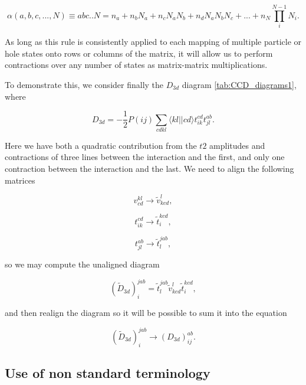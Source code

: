 \begin{equation}
\alpha(a,b,c,...,N) \equiv abc..N = n_a + n_bN_a + n_cN_aN_b + n_dN_aN_bN_c + ... + n_N \prod_i^{N-1} N_i  .
\end{equation}

As long as this rule is consistently applied to each mapping of multiple particle or hole states onto rows or columns of the matrix, it will allow us to perform contractions over any number of states as matrix-matrix multiplications. 

To demonstrate this, we consider finally the $D_{3d}$ diagram \ref{tab:CCD_diagrams1}, where 

\begin{equation}
D_{3d}= -\frac{1}{2} P(ij) \sum_{cdkl} \langle kl \vert \vert cd \rangle t_{ik}^{cd} t_{jl}^{ab}.
\end{equation}

Here we have both a quadratic contribution from the $t2$ amplitudes and contractions of three lines between the interaction and the first, and only one contraction between the interaction and the last. We need to align the following matrices

\begin{equation}
v^{kl}_{cd} \rightarrow \tilde{v}_{kcd}^{l},
\end{equation}

\begin{equation}
t_{ik}^{cd} \rightarrow \tilde{t}^{kcd}_i,
\label{eqn:align_t2}
\end{equation}

\begin{equation}
t_{jl}^{ab} \rightarrow \tilde{t}^{jab}_l,
\end{equation}

so we may compute the unaligned diagram

\begin{equation}
(\tilde{D}_{3d})^{jab}_{i} = \tilde{t}^{jab}_l \tilde{v}_{kcd}^{l}  \tilde{t}^{kcd}_i,
\end{equation}

and then realign the diagram so it will be possible to sum it into the equation

\begin{equation}
 (\tilde{D}_{3d})^{jab}_{i} \rightarrow (D_{3d})^{ab}_{ij}.
\end{equation}

\subsection{Use of non standard terminology}

